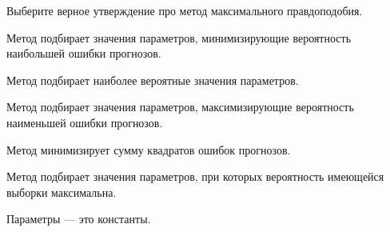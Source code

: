 
\begin{question}
Выберите верное утверждение про метод максимального правдоподобия.
\begin{answerlist}
  \item Метод подбирает значения параметров, минимизирующие вероятность наибольшей ошибки прогнозов.
  \item Метод подбирает наиболее вероятные значения параметров.
  \item Метод подбирает значения параметров, максимизирующие вероятность наименьшей ошибки прогнозов.
  \item Метод минимизирует сумму квадратов ошибок прогнозов.
  \item Метод подбирает значения параметров, при которых вероятность имеющейся выборки максимальна.
\end{answerlist}
\end{question}

\begin{solution}
Параметры --- это константы.
\end{solution}


